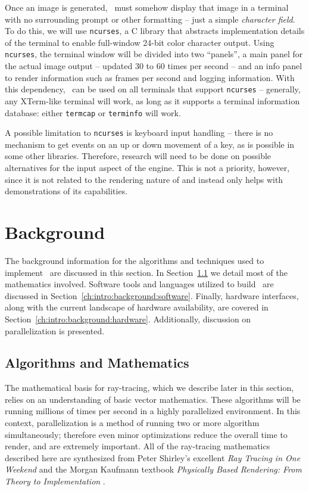 Once an image is generated, \name\ must somehow display that image in a terminal with no surrounding prompt or other formatting -- just a simple {\it character field}.
To do this, we will use \texttt{ncurses}, a C library that abstracts implementation details of the terminal to enable full-window 24-bit color character output.
Using \texttt{ncurses}, the terminal window will be divided into two ``panels'', a main panel for the actual image output -- updated 30 to 60 times per second -- and an info panel to render information such as frames per second and logging information.
With this dependency, \name\ can be used on all terminals that support \texttt{ncurses} -- generally, any XTerm-like terminal will work, as long as it supports a terminal information database: either \texttt{termcap} or \texttt{terminfo} will work.

A possible limitation to \texttt{ncurses} is keyboard input handling -- there is no mechanism to get events on an up or down movement of a key, as is possible in some other libraries.
Therefore, research will need to be done on possible alternatives for the input aspect of the engine.
This is not a priority, however, since it is not related to the rendering nature of \name and instead only helps with demonstrations of its capabilities.


\section{Background} \label{ch:intro:background}

The background information for the algorithms and techniques used to implement \name\ are discussed in this section.
In Section~\ref{ch:intro:background:algorithms} we detail most of the mathematics involved.
Software tools and languages utilized to build \name\ are discussed in Section~\ref{ch:intro:background:software}.
Finally, hardware interfaces, along with the current landscape of hardware availability, are covered in Section~\ref{ch:intro:background:hardware}.
Additionally, discussion on parallelization is presented.

\subsection{Algorithms and Mathematics}
\label{ch:intro:background:algorithms}
The mathematical basis for ray-tracing, which we describe later in this section, relies on an understanding of basic vector mathematics.
These algorithms will be running millions of times per second in a highly parallelized environment.
In this context, parallelization is a method of running two or more algorithm simultaneously; therefore even minor optimizations reduce the overall time to render, and are extremely important.
All of the ray-tracing mathematics described here are synthesized from Peter Shirley's excellent {\it Ray Tracing in One Weekend} \cite{shirley2016ray} and the Morgan Kaufmann textbook {\it Physically Based Rendering: From Theory to Implementation} \cite{pharr2016physically}.

